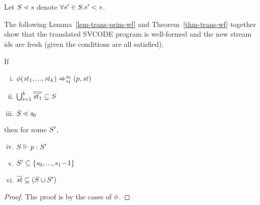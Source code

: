 \begin{itemize}
	\\ [8ex]

	\\[4ex]
	
\end{itemize}


\begin{nota}
	Let $\S \.< s$ denote $\forall s' \in \S. s' < s$.
\end{nota}


The following Lemma~\ref{lem-trans-prim-wf} and Theorem~\ref{thm-trans-wf} together show that the translated SVCODE program is well-formed and the new stream ids are fresh (given the conditions are all satisfied).


\begin{lem} \label{lem-trans-prim-wf}
	If 
	\begin{enumerate}[(i)]
		\item $\Transf{\hcall}{\replc k {\st}} {\s_0} {\s_1} {\sfun{p}{\st}}$ 
		\item $\bigcup_{i=1}^{k}\olol{\st_1} \subseteq \S$
		\item $\S \.< \s_0$
	\end{enumerate}
	then for some $\S'$,
	\begin{enumerate}[(i)]
		\setcounter{enumi}{3}
		\item $\wf{p}{\S}{\S'}$
		\item $\S' \subseteq \{s_0,...,s_1\!-\!1\} $
		\item $\ol{\st} \subseteq (\S \cup \S')$
	\end{enumerate}
\end{lem}
\begin{proof}
    The proof is by the cases of $\hcall$.
\end{proof}


